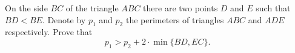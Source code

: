 On the side $BC$ of the triangle $ABC$ there are two points $D$ and $E$ such that $BD < BE$. Denote by $p_1$ and $p_2$ the perimeters of triangles $ABC$ and $ADE$ respectively. Prove that
\[p_1 > p_2 + 2\cdot \min\{BD, EC\}.\]